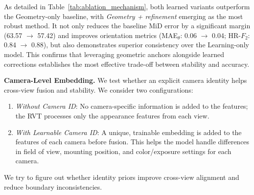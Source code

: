 \documentclass[journal]{IEEEtran}
\begin{document}
As detailed in Table~\ref{tab:ablation_mechanism}, both learned variants outperform the Geometry-only baseline, with \emph{Geometry + refinement} emerging as the most robust method. It not only reduces the baseline MiD error by a significant margin (63.57 \(\to\) 57.42) and improves orientation metrics (MAE\(_\theta\): 0.06 \(\to\) 0.04; HR-\(F_2\): 0.84 \(\to\) 0.88), but also demonstrates superior consistency over the Learning-only model. This confirms that leveraging geometric anchors alongside learned corrections establishes the most effective trade-off between stability and accuracy.


\textbf{Camera-Level Embedding.}
We test whether an explicit camera identity helps cross-view fusion and stability. We consider two configurations:
\begin{enumerate}
    \item \emph{Without Camera ID}: No camera-specific information is added to the features; the RVT processes only the appearance features from each view.
    \item \emph{With Learnable Camera ID}: A unique, trainable embedding is added to the features of each camera before fusion. This helps the model handle differences in field of view, mounting position, and color/exposure settings for each camera.
\end{enumerate}
We try to figure out whether identity priors improve cross-view alignment and reduce boundary inconsistencies.


\end{document}

